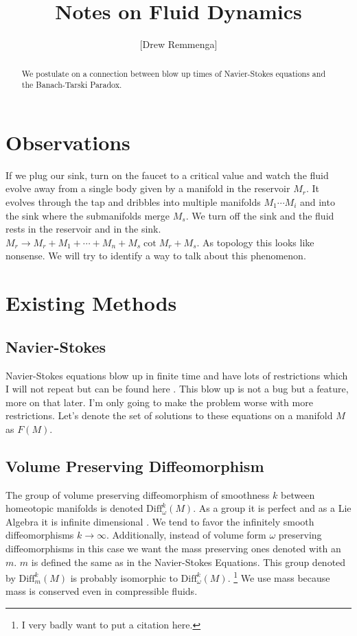 \documentclass[10pt, oneside]{article}
\title{Notes on Fluid Dynamics}
\author{[Drew Remmenga]}
\begin{document}
\maketitle
\begin{abstract}
   We postulate on a connection between blow up times of Navier-Stokes equations and the Banach-Tarski Paradox.
\end{abstract}
\section*{Observations}
   If we plug our sink, turn on the faucet to a critical value and watch the fluid evolve away from a single body given by a manifold in the reservoir $M_r$. It evolves through the tap and dribbles into multiple manifolds $M_1 \cdots M_i$ and into the sink where the submanifolds merge $M_s$.
   We turn off the sink and the fluid rests in the reservoir and in the sink. $M_r \to M_r + M_1 + \cdots + M_n + M_s \cot M_r + M_s$. As topology this looks like nonsense. We will try to identify a way to talk about this phenomenon.
\section*{Existing Methods}
\subsection*{Navier-Stokes}
   Navier-Stokes equations blow up in finite time \cite{tao2015finitetimeblowupaveraged} and have lots of restrictions which I will not repeat but can be found here \cite{tao2015finitetimeblowupaveraged}. This blow up is not a bug but a feature, more on that later.
   I'm only going to make the problem worse with more restrictions. Let's denote the set of solutions to these equations on a manifold $M$ as $F(M)$.
\subsection*{Volume Preserving Diffeomorphism}
   The group of volume preserving diffeomorphism of smoothness $k$ between homeotopic manifolds is denoted $\text{Diff}^k_\omega(M)$. As a group it is perfect and as a Lie Algebra it is infinite dimensional \cite{Banyaga1997}. We tend to favor the infinitely smooth diffeomorphisms $k \to \infty$.
   Additionally, instead of volume form $\omega$ preserving diffeomorphisms in this case we want the mass preserving ones denoted with an $m$. $m$ is defined the same as in the Navier-Stokes Equations. This group denoted by $\text{Diff}^k_m(M)$ is probably isomorphic to $\text{Diff}^k_\omega(M)$. \footnote{I very badly want to put a citation here.}
   We use mass because mass is conserved even in compressible fluids.
\end{document}
